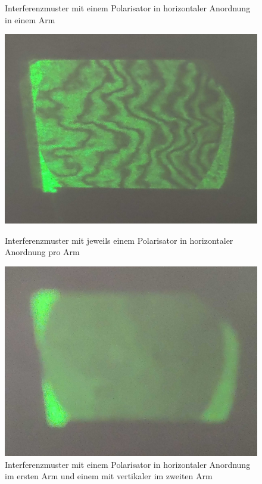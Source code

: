 \documentclass[ngerman]{scrartcl}
\begin{document}
\begin{figure}[H]
\begin{minipage}[t]{0.45\linewidth}
        \caption{Interferenzmuster mit einem Polarisator in horizontaler Anordnung in einem Arm}
        \label{fig:michelson_pol_1_horizontal}
    \end{minipage}
\end{figure}
\setcaphanging

\setcapindent{0pt}
\begin{figure}[H]
    \centering
    \begin{minipage}[t]{0.45\linewidth}
        \centering
        \includegraphics[width=\linewidth]{fig/Compressed/Arago_2_Horizontal_detail.jpg}
        \caption{Interferenzmuster mit jeweils einem Polarisator in horizontaler Anordnung pro Arm}
        \label{fig:michelson_pol_2_horizontal}
    \end{minipage}%
    \hspace*{\fill}
    \begin{minipage}[t]{0.45\linewidth}
        \centering
        \includegraphics[width=\linewidth]{fig/Compressed/Arago_mixed Detail.jpg}
        \caption{Interferenzmuster mit einem Polarisator in horizontaler Anordnung im ersten Arm und einem mit vertikaler im zweiten Arm}
        \label{fig:michelson_pol_mixed}
    \end{minipage}
\end{figure}
\end{document}
